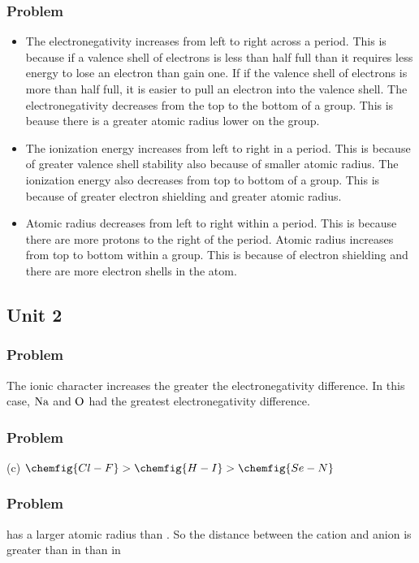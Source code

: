\documentclass[../main.tex]{subfiles}
\begin{document}
\subsubsection*{Problem \countThis}
\begin{itemize}
\item The electronegativity increases from left to right across a period. This is because if a valence shell of electrons is less than half full than
it requires less energy to lose an electron than gain one. If if the valence shell of electrons is more than half full, it is easier to pull an electron
into the valence shell. The electronegativity decreases from the top to the bottom of a group. This is beause there is a greater atomic radius lower on the group.

\item The ionization energy increases from left to right in a period. This is because of greater valence shell stability also because of smaller atomic radius. The ionization energy also decreases
from top to bottom of a group. This is because of greater electron shielding and greater atomic radius. 

\item Atomic radius decreases from left to right within a period. This is because there are more protons to the right of the period. Atomic radius increases from top to bottom within a group.
 This is because of electron shielding and there are more electron shells in the atom. 
\end{itemize}  
\subsection{Unit 2}
\subsubsection*{Problem \countThis}
The ionic character increases the greater the electronegativity difference. In this case, \(\ce{Na}\) and \(\ce{O}\) had the greatest electronegativity difference. 
\subsubsection*{Problem \countThis}
(c) \(\chemfig{Cl-F} > \chemfig{H-I} > \chemfig{Se-N}\)
\subsubsection*{Problem \countThis}
 has a larger atomic radius than . So the distance between the cation and anion is greater than in  than in 
\end{document}
